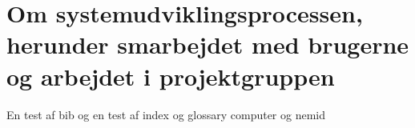\chapter{Om systemudviklingsprocessen, herunder smarbejdet med brugerne og arbejdet i projektgruppen}

En test af bib \cite{Nobody06} og en test af index  og  glossary \gls{computer} og \gls{nemid}




